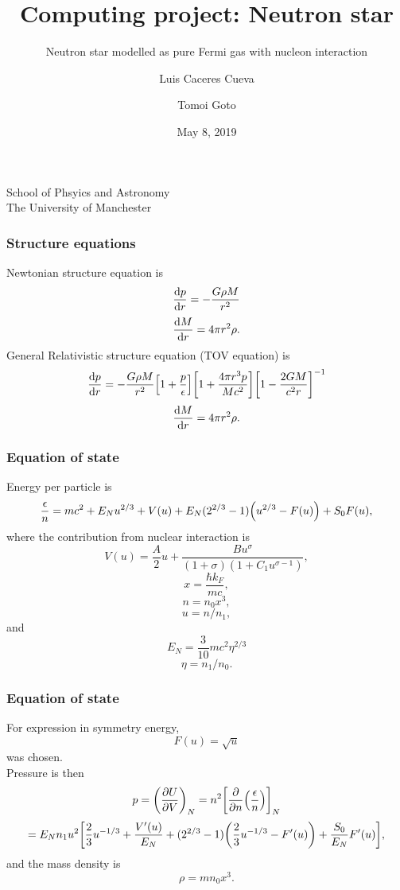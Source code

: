 \documentclass[hperref={pdfpagelabels=false}]{beamer}
\begin{document}
\title
{Computing project: Neutron star}

\subtitle{Neutron star modelled as pure Fermi gas with nucleon interaction}

\author
{Luis Caceres Cueva \and Tomoi Goto}

\institute
{
    School of Phsyics and Astronomy\\
    The University of Manchester
}
\date
{May 8, 2019}

\begin{frame}
 \titlepage
\end{frame}

\begin{frame}
 \frametitle{Structure equations}
 Newtonian structure equation is
\[\dv{p}{r}=-\frac{G\rho M}{r^{2}}\]
\[\dv{M}{r}=4\pi r^{2}\rho.\]
General Relativistic structure equation (TOV equation) is
\[\dv{p}{r}=-\frac{G\rho M}{r^{2}}\qty[1+\frac{p}{\epsilon}]\qty[1+\frac{4\pi r^{3}p}{Mc^{2}}]\qty[1-\frac{2GM}{c^{2}r}]^{-1}\]
\[\dv{M}{r}=4\pi r^{2}\rho.\]
\end{frame}

\begin{frame}
 \frametitle{Equation of state}
 Energy per particle is
\[\frac{\epsilon}{n}=mc^{2}+E_{N}u^{2/3}+V(u)+E_{N}(2^{2/3}-1)\qty(u^{2/3}-F(u))+S_{0}F(u),\]
 where the contribution from nuclear interaction is
 \[V(u)=\frac{A}{2}u+\frac{Bu^{\sigma}}{(1+\sigma)(1+C_{1}u^{\sigma-1})},\]
\[x=\frac{\hbar k_{F}}{mc},\]
 \[n=n_{0}x^{3},\]
 \[u=n/n_{1},\]
 and
 \[E_{N}=\frac{3}{10}mc^{2}\eta^{2/3}\]
 \[\eta=n_{1}/n_{0}.\]
\end{frame}

\begin{frame}
\frametitle{Equation of state}
 For expression in symmetry energy,
 \[F(u)=\sqrt{u}\]
 was chosen.\\
 Pressure is then 
 \[p=\qty(\pdv{U}{V})_{N}=n^{2}\qty[\pdv{n}(\frac{\epsilon}{n})]_{N}\]
 \[=E_{N}n_{1}u^{2}\qty[\frac{2}{3}u^{-1/3}+\frac{V'(u)}{E_{N}}+(2^{2/3}-1)\qty(\frac{2}{3}u^{-1/3}-F'(u))+\frac{S_{0}}{E_{N}}F'(u)],\]
 and the mass density is
 \[\rho=mn_{0}x^{3}.\]
\end{frame}
\end{document}
